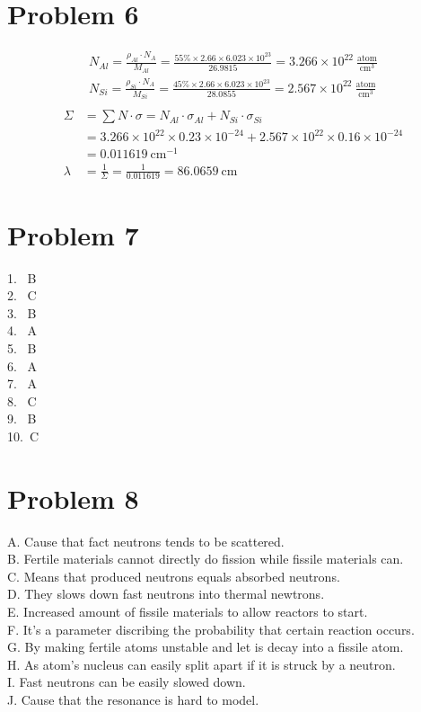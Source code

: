 \documentclass{article}
\begin{document}
\section*{Problem 6}
    \begin{align*}
        N_{Al}=\frac{\rho_{Al}\cdot N_A}{M_{Al}}=\frac{55\%\times 2.66\times 6.023\times 10^{23}}{26.9815}=3.266\times 10^{22}\  \frac{\text{atom}}{\text{cm}^3}\\
        N_{Si}=\frac{\rho_{Si}\cdot N_A}{M_{Si}}=\frac{45\%\times 2.66\times 6.023\times 10^{23}}{28.0855}=2.567\times 10^{22}\  \frac{\text{atom}}{\text{cm}^3}\\
    \end{align*}
    \begin{align*}
        \Sigma &= \sum N\cdot \sigma =N_{Al}\cdot \sigma_{Al}+N_{Si}\cdot \sigma_{Si}\\
                &=3.266\times 10^{22}\times 0.23\times 10^{-24} + 2.567\times 10^{22}\times 0.16\times 10^{-24}\\
                &=0.011619\ \text{cm}^{-1}\\
        \lambda &= \frac{1}{\Sigma}=\frac{1}{0.011619}=86.0659\  \text{cm}
    \end{align*}
\section*{Problem 7}
    1. \ B\\
    2. \ C\\
    3. \ B\\
    4. \ A\\
    5. \ B\\
    6. \ A\\
    7. \ A\\
    8. \ C\\
    9. \ B\\
    10.\ C\\ 
\section*{Problem 8}
    A. Cause that fact neutrons tends to be scattered.\\
    B. Fertile materials cannot directly do fission while fissile materials can.\\
    C. Means that produced neutrons equals absorbed neutrons.\\
    D. They slows down fast neutrons into thermal newtrons.\\
    E. Increased amount of fissile materials to allow reactors to start.\\
    F. It's a parameter discribing the probability that certain reaction occurs.\\
    G. By making fertile atoms unstable and let is decay into a fissile atom.\\
    H. As atom's nucleus can easily split apart if it is struck by a neutron.\\
    I. Fast neutrons can be easily slowed down.\\
    J. Cause that the resonance is hard to model.\\
\end{document}
